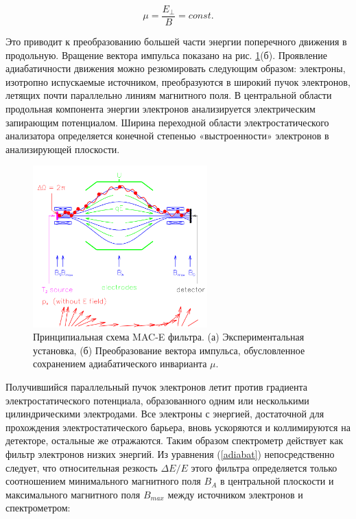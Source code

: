 ﻿\documentclass[a4paper,14pt]{extarticle}
\begin{document}
    \begin{equation}\label{adiabat}
        \mu = \frac{E_\perp}{B} = const.
    \end{equation}

Это приводит к преобразованию большей части энергии поперечного движения в продольную. Вращение вектора импульса 
    показано на рис. \ref{fig:spectrometer}(б). Проявление адиабатичности движения можно резюмировать следующим образом: электроны, изотропно испускаемые
    источником, преобразуются в широкий пучок электронов, летящих почти параллельно линиям магнитного поля. 
В центральной области продольная компонента энергии электронов анализируется электрическим запирающим потенциалом. Ширина переходной области электростатического анализатора определяется конечной степенью «выстроенности» электронов в анализирующей плоскости. 
    
    \begin{figure}
        \center
        \includegraphics[width=0.6\textwidth]{spectrometer.png}
        \captionsetup{width=0.8\textwidth}
        \caption{Принципиальная схема MAC-E фильтра. (а) Экспериментальная установка, (б) Преобразование вектора импульса, обусловленное сохранением адиабатического инварианта $\mu$.}
        \label{fig:spectrometer}
    \end{figure}
    
    Получившийся параллельный пучок электронов летит против градиента электростатического потенциала, образованного
    одним или несколькими цилиндрическими электродами. Все электроны с энергией, достаточной для прохождения
    электростатического барьера, вновь ускоряются и коллимируются на детекторе, остальные же отражаются.
    Таким образом спектрометр действует как фильтр электронов низких энергий. Из уравнения (\ref{adiabat})
    непосредственно следует, что относительная резкость $\Delta E/E$ этого фильтра определяется только соотношением
    минимального магнитного поля $B_A$ в центральной плоскости и максимального магнитного поля
    $B_{max}$ между источником электронов и спектрометром:
    
\end{document}

